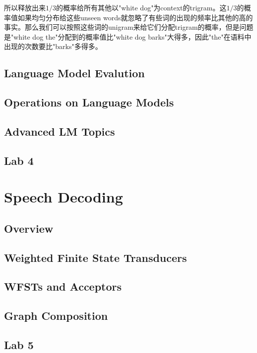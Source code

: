 所以释放出来$1/3$的概率给所有其他以"white dog"为context的trigram。这$1/3$的概率值如果均匀分布给这些unseen words就忽略了有些词的出现的频率比其他的高的事实。那么我们可以按照这些词的unigram来给它们分配trigram的概率，但是问题是"white dog the"分配到的概率值比"white dog barks"大得多，因此"the"在语料中出现的次数要比"barks"多得多。
\subsection{Language Model Evalution}

\subsection{Operations on Language Models}

\subsection{Advanced LM Topics}

\subsection{Lab 4}

\section{Speech Decoding}
\subsection{Overview}

\subsection{Weighted Finite State Transducers}

\subsection{WFSTs and Acceptors}

\subsection{Graph Composition}

\subsection{Lab 5}


